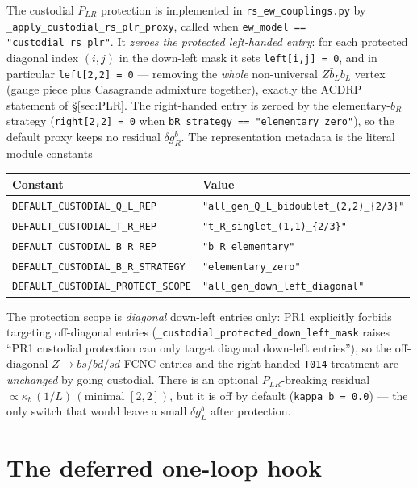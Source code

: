 \documentclass[11pt]{article}
\newcommand{\PLR}{P_{LR}}
\newcommand{\code}[1]{\texttt{#1}}
\newcommand{\dgL}{\delta g_L^b}
\newcommand{\dgR}{\delta g_R^b}
\theoremstyle{definition}
\begin{document}
The custodial $\PLR$ protection is implemented in \code{rs\_ew\_couplings.py} by
\code{\_apply\_custodial\_rs\_plr\_proxy}, called when
\code{ew\_model == "custodial\_rs\_plr"}. It \emph{zeroes the protected
left-handed entry}: for each protected diagonal index $(i,j)$ in the down-left
mask it sets \code{left[i,j] = 0}, and in particular \code{left[2,2] = 0} ---
removing the \emph{whole} non-universal $Z\bar b_L b_L$ vertex (gauge piece plus
Casagrande admixture together), exactly the ACDRP statement of \S\ref{sec:PLR}.
The right-handed entry is zeroed by the elementary-$b_R$ strategy
(\code{right[2,2] = 0} when \code{bR\_strategy == "elementary\_zero"}), so the
default proxy keeps no residual $\dgR$. The representation metadata is the literal
module constants
\begin{center}
\begin{tabular}{ll}
\toprule
Constant & Value \\
\midrule
\code{DEFAULT\_CUSTODIAL\_Q\_L\_REP}   & \code{"all\_gen\_Q\_L\_bidoublet\_(2,2)\_\{2/3\}"} \\
\code{DEFAULT\_CUSTODIAL\_T\_R\_REP}   & \code{"t\_R\_singlet\_(1,1)\_\{2/3\}"} \\
\code{DEFAULT\_CUSTODIAL\_B\_R\_REP}   & \code{"b\_R\_elementary"} \\
\code{DEFAULT\_CUSTODIAL\_B\_R\_STRATEGY} & \code{"elementary\_zero"} \\
\code{DEFAULT\_CUSTODIAL\_PROTECT\_SCOPE} & \code{"all\_gen\_down\_left\_diagonal"} \\
\bottomrule
\end{tabular}
\end{center}
The protection scope is \emph{diagonal} down-left entries only: PR1 explicitly
forbids targeting off-diagonal entries (\code{\_custodial\_protected\_down\_left\_mask}
raises ``PR1 custodial protection can only target diagonal down-left entries''),
so the off-diagonal $Z\to bs/bd/sd$ FCNC entries and the right-handed \code{T014}
treatment are \emph{unchanged} by going custodial. There is an optional
$\PLR$-breaking residual $\propto\kappa_b\,(1/L)\,(\text{minimal }[2,2])$, but it
is off by default (\code{kappa\_b = 0.0}) --- the only switch that would leave a
small $\dgL$ after protection.

\section{The deferred one-loop hook}
\label{sec:codeloop}
\end{document}
